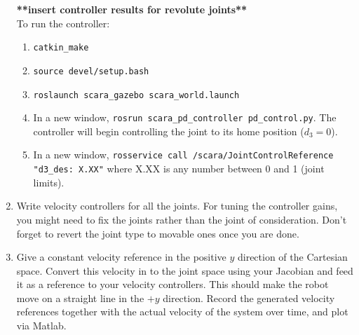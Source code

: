 \documentclass[10pt]{article}
\begin{document}
\begin{enumerate}
	\textbf{**insert controller results for revolute joints**}
	\\
	
	To run the controller:
	
	\begin{enumerate}
		\item \texttt{catkin\_make}
		\item \texttt{source devel/setup.bash}
		\item \texttt{roslaunch scara\_gazebo scara\_world.launch}
		\item In a new window, \texttt{rosrun scara\_pd\_controller pd\_control.py}. The controller will begin controlling the joint to its home position ($d_3 = 0$).
		\item In a new window, \texttt{rosservice call /scara/JointControlReference "d3\_des: X.XX"} where X.XX is any number between 0 and 1 (joint limits).
	\end{enumerate}
	
	\item Write velocity controllers for all the joints. For tuning the controller gains, you might need to fix the joints rather than the joint of consideration. Don't forget to revert the joint type to movable ones once you are done.
	
	\item Give a constant velocity reference in the positive $y$ direction of the Cartesian space. Convert this velocity in to the joint space using your Jacobian and feed it as a reference to your velocity controllers. This should make the robot move on a straight line in the $+y$ direction. Record the generated velocity references together with the actual velocity of the system over time, and plot via Matlab.
	
\end{enumerate}
\end{document}
